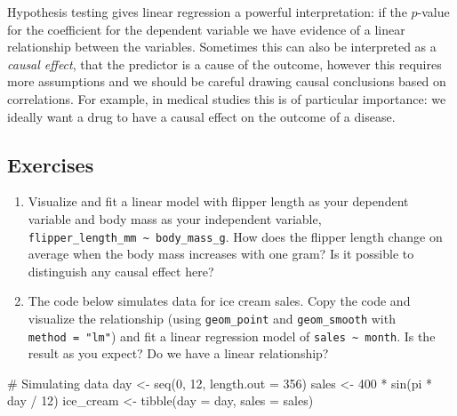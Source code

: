 \documentclass[
  letterpaper,
  DIV=11,
  numbers=noendperiod]{scrreprt}
\newenvironment{Shaded}{\begin{snugshade}}{\end{snugshade}}
\newcommand{\AttributeTok}[1]{\textcolor[rgb]{0.40,0.45,0.13}{#1}}
\newcommand{\CommentTok}[1]{\textcolor[rgb]{0.37,0.37,0.37}{#1}}
\newcommand{\DecValTok}[1]{\textcolor[rgb]{0.68,0.00,0.00}{#1}}
\newcommand{\FunctionTok}[1]{\textcolor[rgb]{0.28,0.35,0.67}{#1}}
\newcommand{\NormalTok}[1]{\textcolor[rgb]{0.00,0.23,0.31}{#1}}
\newcommand{\OtherTok}[1]{\textcolor[rgb]{0.00,0.23,0.31}{#1}}
\newcommand{\SpecialCharTok}[1]{\textcolor[rgb]{0.37,0.37,0.37}{#1}}
\providecommand{\tightlist}{%
  \setlength{\itemsep}{0pt}\setlength{\parskip}{0pt}}\usepackage{longtable,booktabs,array}
\begin{document}
Hypothesis testing gives linear regression a powerful interpretation: if
the \(p\)-value for the coefficient for the dependent variable we have
evidence of a linear relationship between the variables. Sometimes this
can also be interpreted as a \emph{causal effect}, that the predictor is
a cause of the outcome, however this requires more assumptions and we
should be careful drawing causal conclusions based on correlations. For
example, in medical studies this is of particular importance: we ideally
want a drug to have a causal effect on the outcome of a disease.

\subsection{Exercises}\label{exercises-12}

\begin{enumerate}
\def\labelenumi{\arabic{enumi}.}
\tightlist
\item
  Visualize and fit a linear model with flipper length as your dependent
  variable and body mass as your independent variable,
  \texttt{flipper\_length\_mm\ \textasciitilde{}\ body\_mass\_g}. How
  does the flipper length change on average when the body mass increases
  with one gram? Is it possible to distinguish any causal effect here?
\item
  The code below simulates data for ice cream sales. Copy the code and
  visualize the relationship (using \texttt{geom\_point} and
  \texttt{geom\_smooth} with \texttt{method\ =\ "lm"}) and fit a linear
  regression model of \texttt{sales\ \textasciitilde{}\ month}. Is the
  result as you expect? Do we have a linear relationship?
\end{enumerate}

\begin{Shaded}
\begin{Highlighting}[]
\CommentTok{\# Simulating data}
\NormalTok{day }\OtherTok{\textless{}{-}} \FunctionTok{seq}\NormalTok{(}\DecValTok{0}\NormalTok{, }\DecValTok{12}\NormalTok{, }\AttributeTok{length.out =} \DecValTok{356}\NormalTok{)}
\NormalTok{sales }\OtherTok{\textless{}{-}} \DecValTok{400} \SpecialCharTok{*} \FunctionTok{sin}\NormalTok{(pi }\SpecialCharTok{*}\NormalTok{ day }\SpecialCharTok{/} \DecValTok{12}\NormalTok{)}
\NormalTok{ice\_cream }\OtherTok{\textless{}{-}} \FunctionTok{tibble}\NormalTok{(}\AttributeTok{day =}\NormalTok{ day, }\AttributeTok{sales =}\NormalTok{ sales)}
\end{Highlighting}
\end{Shaded}
\end{document}
